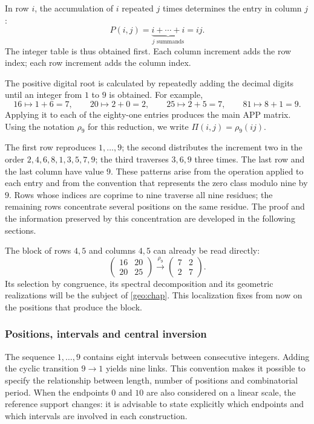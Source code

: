 In row $i$, the accumulation of $i$ repeated $j$ times determines the entry in column $j$:
\[
 P(i,j)=\underbrace{i+\cdots+i}_{j\text{ summands}}=ij.
\]
The integer table is thus obtained first. Each column increment adds the row index; each row increment adds the column index.



The positive digital root is calculated by repeatedly adding the decimal digits until an integer from $1$ to $9$ is obtained. For example,
\[
 16\longmapsto1+6=7,\qquad
 20\longmapsto2+0=2,\qquad
 25\longmapsto2+5=7,\qquad
 81\longmapsto8+1=9.
\]
Applying it to each of the eighty-one entries produces the main APP matrix. Using the notation $\rho_9$ for this reduction, we write $\Pi(i,j)=\rho_9(ij)$.



The first row reproduces $1,\ldots,9$; the second distributes the increment two in the order $2,4,6,8,1,3,5,7,9$; the third traverses $3,6,9$ three times. The last row and the last column have value $9$. These patterns arise from the operation applied to each entry and from the convention that represents the zero class modulo nine by $9$. Rows whose indices are coprime to nine traverse all nine residues; the remaining rows concentrate several positions on the same residue. The proof and the information preserved by this concentration are developed in the following sections.

The block of rows $4,5$ and columns $4,5$ can already be read directly:
\[
 \begin{pmatrix}16&20\\20&25\end{pmatrix}
 \xrightarrow{\ \rho_9\ }
 \begin{pmatrix}7&2\\2&7\end{pmatrix}.
\]
Its selection by congruence, its spectral decomposition and its geometric realizations will be the subject of \cref{geo:chap}. This localization fixes from now on the positions that produce the block.

\subsubsection{Positions, intervals and central inversion}

The sequence $1,\ldots,9$ contains eight intervals between consecutive integers. Adding the cyclic transition $9\to1$ yields nine links. This convention makes it possible to specify the relationship between length, number of positions and combinatorial period. When the endpoints $0$ and $10$ are also considered on a linear scale, the reference support changes: it is advisable to state explicitly which endpoints and which intervals are involved in each construction.

